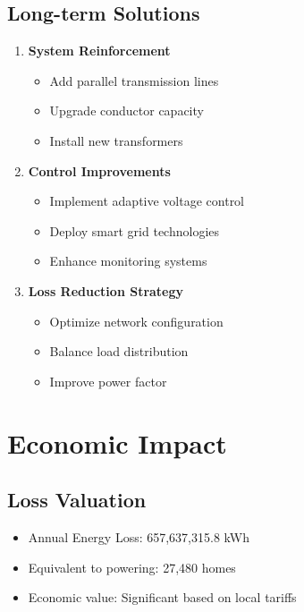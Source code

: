 \documentclass[11pt]{article}
\begin{document}
\subsection{Long-term Solutions}
\begin{enumerate}
    \item \textbf{System Reinforcement}
    \begin{itemize}
        \item Add parallel transmission lines
        \item Upgrade conductor capacity
        \item Install new transformers
    \end{itemize}
    
    \item \textbf{Control Improvements}
    \begin{itemize}
        \item Implement adaptive voltage control
        \item Deploy smart grid technologies
        \item Enhance monitoring systems
    \end{itemize}
    
    \item \textbf{Loss Reduction Strategy}
    \begin{itemize}
        \item Optimize network configuration
        \item Balance load distribution
        \item Improve power factor
    \end{itemize}
\end{enumerate}

\section{Economic Impact}

\subsection{Loss Valuation}
\begin{itemize}
    \item Annual Energy Loss: 657,637,315.8 kWh
    \item Equivalent to powering: 27,480 homes
    \item Economic value: Significant based on local tariffs
\end{itemize}
\end{document}
